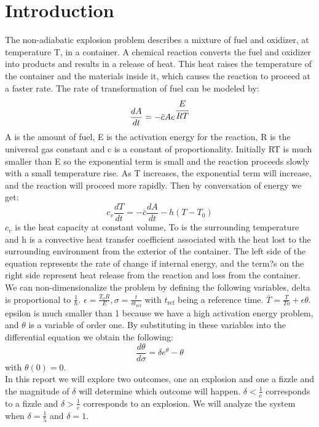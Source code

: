 \documentclass{article}
\begin{document}
\section*{Introduction}
The non-adiabatic explosion problem describes a mixture of fuel and oxidizer, at temperature T, in a container. A chemical reaction converts the fuel and oxidizer into products and results in a release of heat. This heat raises the temperature of the container and the materials inside it, which causes the reaction to proceed at a faster rate. The rate of transformation of fuel can be modeled by:
\[\frac{dA}{dt}=-\bar{c}Ae^{\cfrac{E}{RT}}\]
A is the amount of fuel, E is the activation energy for the reaction, R is the universal gas constant and c is a constant of proportionality. Initially RT is much smaller than E so the exponential term is small and the reaction proceeds slowly with a small temperature rise. As T increases, the exponential term will increase, and the reaction will proceed more rapidly. Then by conversation of energy we get:
\[c_v\frac{dT}{dt}=-\bar{c}\frac{dA}{dt}-h(T-T_0)\]
$c_v$ is the heat capacity at constant volume, To is the surrounding temperature and h is a convective heat transfer coefficient associated with the heat lost to the surrounding environment from the exterior of the container. The left side of the equation represents the rate of change if internal energy, and the term?s on the right side represent heat release from the reaction and loss from the container.\\
We can non-dimensionalize the problem by defining the following variables, delta is proportional to $\frac{1}{h}$. $\epsilon = \frac{T_oR}{E}, \sigma = \frac{t}{\delta t_{\text{ref}}}$ with $t_{\text{ref}}$ being a reference time. $\bar{T} = \frac{T}{To}+\epsilon\theta$. epsilon is much smaller than 1 because we have a high activation energy problem, and $\theta$ is a variable of order one. By substituting in these variables into the differential equation we obtain the following:
\[\frac{d\theta}{d\sigma}=\delta e^{\theta}- \theta\]
with $\theta(0) = 0$.\\
In this report we will explore two outcomes, one an explosion and one a fizzle and the magnitude of $\delta$ will determine which outcome will happen. $\delta < \frac{1}{e}$ corresponds to a fizzle and $\delta > \frac{1}{e}$ corresponds to an explosion. We will analyze the system when $\delta=\frac{1}{5}$  and $\delta = 1$.
\end{document}
